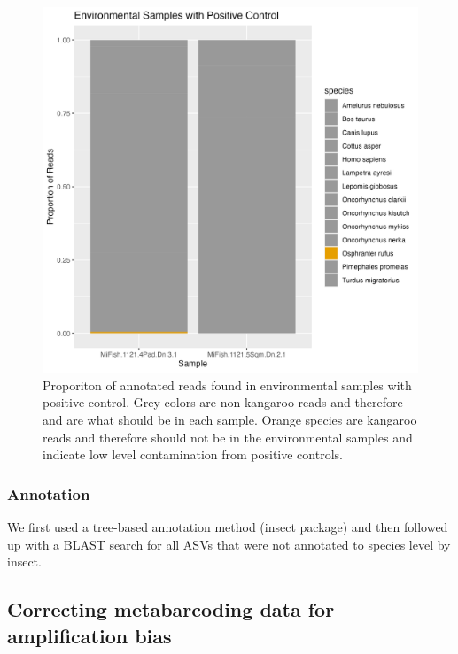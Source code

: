 \documentclass[
]{article}
\begin{document}
\begin{figure}
\centering
\includegraphics{../Output/SupplementalFigures/check_controls2.png}
\caption{Proporiton of annotated reads found in environmental samples
with positive control. Grey colors are non-kangaroo reads and therefore
and are what should be in each sample. Orange species are kangaroo reads
and therefore should not be in the environmental samples and indicate
low level contamination from positive controls.}
\end{figure}

\hypertarget{annotation}{%
\subsubsection{Annotation}\label{annotation}}

We first used a tree-based annotation method (insect package) and then
followed up with a BLAST search for all ASVs that were not annotated to
species level by insect.

\hypertarget{correcting-metabarcoding-data-for-amplification-bias}{%
\subsection{Correcting metabarcoding data for amplification
bias}\label{correcting-metabarcoding-data-for-amplification-bias}}
\end{document}
